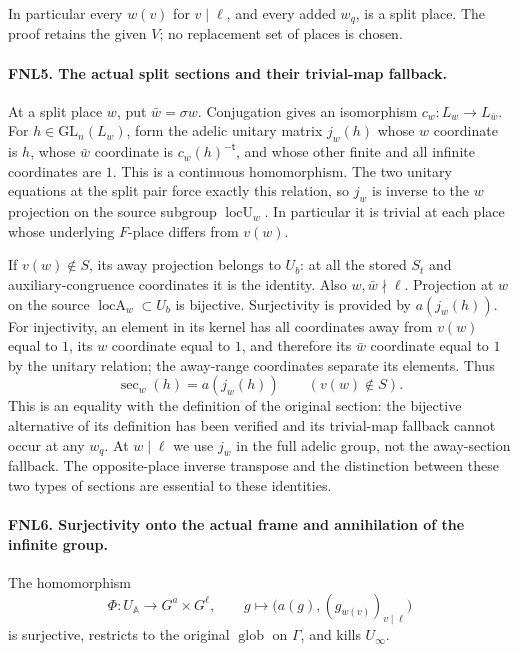 \documentclass[11pt,a4paper]{article}
\numberwithin{equation}{section}
\theoremstyle{remark}\newtheorem{remark}[theorem]{Remark}
\begin{document}
In particular every \(w(v)\) for \(v\mid\ell\), and every added
\(w_q\), is a split place.  The proof retains the given \(V\); no
replacement set of places is chosen.

\paragraph{FNL5. The actual split sections and their trivial-map fallback.}
\label{claim:FNL5}
At a split place \(w\), put \(\bar w=\sigma w\).  Conjugation gives
an isomorphism \(c_w:L_w\to L_{\bar w}\).  For
\(h\in\mathrm{GL}_n(L_w)\), form the adelic unitary matrix \(j_w(h)\)
whose \(w\) coordinate is \(h\), whose \(\bar w\) coordinate is
\(c_w(h)^{-\mathsf t}\), and whose other finite and all infinite
coordinates are \(1\).  This is a continuous homomorphism.  The two
unitary equations at the split pair force exactly this relation, so
\(j_w\) is inverse to the \(w\) projection on the source subgroup
\(\operatorname{locU}_w\).  In particular it is trivial at each
place whose underlying \(F\)-place differs from \(v(w)\).

If \(v(w)\notin S\), its away projection belongs to \(U_b\): at all
the stored \(S_t\) and auxiliary-congruence coordinates it is the
identity.  Also \(w,\bar w\nmid\ell\).  Projection at \(w\) on the
source \(\operatorname{locA}_w\subset U_b\) is bijective.  Surjectivity
is provided by \(a(j_w(h))\).  For injectivity, an element in its
kernel has all coordinates away from \(v(w)\) equal to \(1\), its
\(w\) coordinate equal to \(1\), and therefore its \(\bar w\)
coordinate equal to \(1\) by the unitary relation; the away-range
coordinates separate its elements.  Thus
\[
       \operatorname{sec}_w(h)=a(j_w(h))
          \qquad(v(w)\notin S).
\]
This is an equality with the definition of the original section:
the bijective alternative of its definition has been verified and
its trivial-map fallback cannot occur at any \(w_q\).  At \(w\mid\ell\)
we use \(j_w\) in the full adelic group, not the away-section fallback.
The opposite-place inverse transpose and the distinction between these
two types of sections are essential to these identities.

\paragraph{FNL6. Surjectivity onto the actual frame and annihilation of the infinite group.}
\label{claim:FNL6}
The homomorphism
\[
 \Phi:U_{\mathbb A}\longrightarrow G^a\times G^\ell,
 \qquad g\longmapsto\bigl(a(g),(g_{w(v)})_{v\mid\ell}\bigr)
\]
is surjective, restricts to the original \(\operatorname{glob}\) on
\(\Gamma\), and kills \(U_\infty\).
\end{document}
